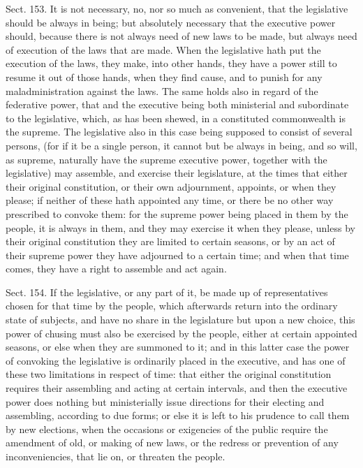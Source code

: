 \documentclass[11pt,openany]{book}
\begin{document}
Sect. 153. It is not necessary, no, nor so much as convenient, that the legislative should be always in being; but absolutely necessary that the executive power should, because there is not always need of new laws to be made, but always need of execution of the laws that are made. When the legislative hath put the execution of the laws, they make, into other hands, they have a power still to resume it out of those hands, when they find cause, and to punish for any maladministration against the laws. The same holds also in regard of the federative power, that and the executive being both ministerial and subordinate to the legislative, which, as has been shewed, in a constituted commonwealth is the supreme. The legislative also in this case being supposed to consist of several persons, (for if it be a single person, it cannot but be always in being, and so will, as supreme, naturally have the supreme executive power, together with the legislative) may assemble, and exercise their legislature, at the times that either their original constitution, or their own adjournment, appoints, or when they please; if neither of these hath appointed any time, or there be no other way prescribed to convoke them: for the supreme power being placed in them by the people, it is always in them, and they may exercise it when they please, unless by their original constitution they are limited to certain seasons, or by an act of their supreme power they have adjourned to a certain time; and when that time comes, they have a right to assemble and act again.

Sect. 154. If the legislative, or any part of it, be made up of representatives chosen for that time by the people, which afterwards return into the ordinary state of subjects, and have no share in the legislature but upon a new choice, this power of chusing must also be exercised by the people, either at certain appointed seasons, or else when they are summoned to it; and in this latter case the power of convoking the legislative is ordinarily placed in the executive, and has one of these two limitations in respect of time: that either the original constitution requires their assembling and acting at certain intervals, and then the executive power does nothing but ministerially issue directions for their electing and assembling, according to due forms; or else it is left to his prudence to call them by new elections, when the occasions or exigencies of the public require the amendment of old, or making of new laws, or the redress or prevention of any inconveniencies, that lie on, or threaten the people.
\end{document}
